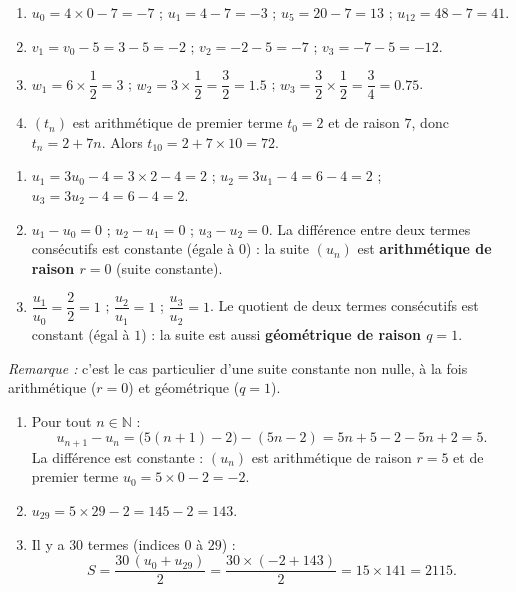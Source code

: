 \documentclass[11pt]{article}
\begin{document}
\begin{corrige}
\begin{enumerate}
\item $u_0 = 4\times 0 - 7 = -7$ ; $u_1 = 4 - 7 = -3$ ; $u_5 = 20 - 7 = 13$ ; $u_{12} = 48 - 7 = 41$.
\item $v_1 = v_0 - 5 = 3 - 5 = -2$ ; $v_2 = -2 - 5 = -7$ ; $v_3 = -7 - 5 = -12$.
\item $w_1 = 6 \times \dfrac{1}{2} = 3$ ; $w_2 = 3 \times \dfrac{1}{2} = \dfrac{3}{2} = \num{1,5}$ ; $w_3 = \dfrac{3}{2}\times\dfrac{1}{2} = \dfrac{3}{4} = \num{0,75}$.
\item $(t_n)$ est arithmétique de premier terme $t_0 = 2$ et de raison $7$, donc $t_n = 2 + 7n$. Alors $t_{10} = 2 + 7\times 10 = 72$.
\end{enumerate}
\end{corrige}

\begin{corrige}
\begin{enumerate}
\item $u_1 = 3u_0 - 4 = 3\times 2 - 4 = 2$ ; $u_2 = 3u_1 - 4 = 6 - 4 = 2$ ; $u_3 = 3u_2 - 4 = 6 - 4 = 2$.
\item $u_1 - u_0 = 0$ ; $u_2 - u_1 = 0$ ; $u_3 - u_2 = 0$. La différence entre deux termes consécutifs est constante (égale à $0$) : la suite $(u_n)$ est \textbf{arithmétique de raison $r = 0$} (suite constante).
\item $\dfrac{u_1}{u_0} = \dfrac{2}{2} = 1$ ; $\dfrac{u_2}{u_1} = 1$ ; $\dfrac{u_3}{u_2} = 1$. Le quotient de deux termes consécutifs est constant (égal à $1$) : la suite est aussi \textbf{géométrique de raison $q = 1$}.
\end{enumerate}
\emph{Remarque :} c'est le cas particulier d'une suite constante non nulle, à la fois arithmétique ($r=0$) et géométrique ($q=1$).
\end{corrige}

\begin{corrige}
\begin{enumerate}
\item Pour tout $n \in \mathbb{N}$ :
\[ u_{n+1} - u_n = \bigl(5(n+1) - 2\bigr) - (5n - 2) = 5n + 5 - 2 - 5n + 2 = 5. \]
La différence est constante : $(u_n)$ est arithmétique de raison $r = 5$ et de premier terme $u_0 = 5\times 0 - 2 = -2$.
\item $u_{29} = 5\times 29 - 2 = 145 - 2 = 143$.
\item Il y a $30$ termes (indices $0$ à $29$) :
\[ S = \frac{30\,(u_0 + u_{29})}{2} = \frac{30\times(-2 + 143)}{2} = 15 \times 141 = \num{2115}. \]
\end{enumerate}
\end{corrige}
\end{document}
